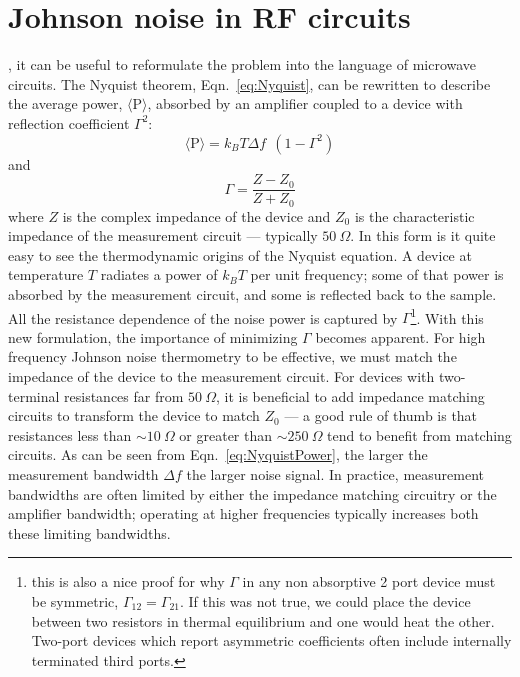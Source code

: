 \section{Johnson noise in RF circuits}
, it can be useful to reformulate the problem into the language of microwave circuits. The Nyquist theorem, Eqn.~\ref{eq:Nyquist}, can be rewritten to describe the average power, $\langle\mathrm{P}\rangle$, absorbed by an amplifier coupled to a device with reflection coefficient $\Gamma^2$:
\begin{equation}\label{eq:NyquistPower}
\langle\mathrm{P}\rangle = k_BT\Delta f~~(1-\Gamma^2)
\end{equation}
and
\begin{equation}\label{eq:Gamma}
\Gamma = \frac{Z-Z_0}{Z+Z_0}
\end{equation}
where $Z$ is the complex impedance of the device and $Z_0$ is the characteristic impedance of the measurement circuit --- typically $50~\Omega$. In this form is it quite easy to see the thermodynamic origins of the Nyquist equation. A device at temperature $T$ radiates a power of $k_BT$ per unit frequency; some of that power is absorbed by the measurement circuit, and some is reflected back to the sample. All the resistance dependence of the noise power is captured by $\Gamma$\footnote{this is also a nice proof for why $\Gamma$ in any non absorptive 2 port device must be symmetric, $\Gamma_{12}=\Gamma_{21}$. If this was not true, we could place the device between two resistors in thermal equilibrium and one would heat the other. Two-port devices which report asymmetric coefficients often include internally terminated third ports.}.
With this new formulation, the importance of minimizing $\Gamma$ becomes apparent. For high frequency Johnson noise thermometry to be effective, we must match the impedance of the device to the measurement circuit. For devices with two-terminal resistances far from $50~\Omega$, it is beneficial to add impedance matching circuits to transform the device to match $Z_0$ --- a good rule of thumb is that resistances less than ${\sim}10~\Omega$ or greater than ${\sim}250~\Omega$ tend to benefit from matching circuits.
As can be seen from Eqn.~\ref{eq:NyquistPower}, the larger the measurement bandwidth $\Delta f$ the larger noise signal. In practice, measurement bandwidths are often limited by either the impedance matching circuitry or the amplifier bandwidth; operating at higher frequencies typically increases both these limiting bandwidths.

